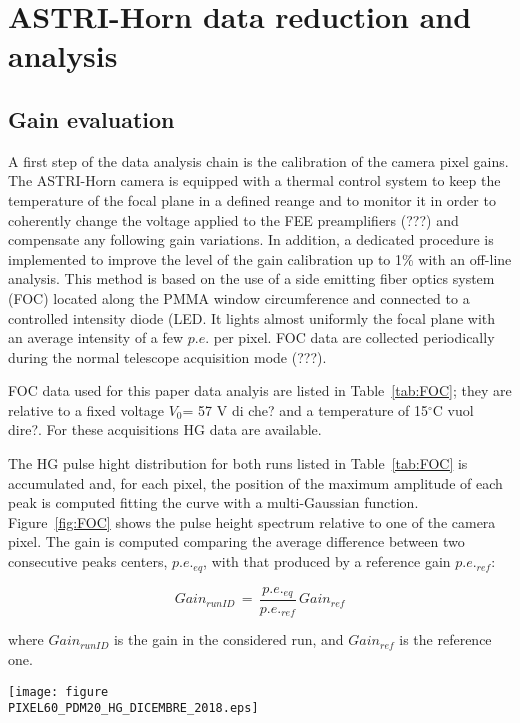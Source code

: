 \section{ASTRI-Horn data reduction and analysis} 
\label{sect:astridata}

\subsection{Gain evaluation}
\label{subs:gain}

A first step of the data analysis chain is the calibration of the camera pixel gains. 
The ASTRI-Horn camera is equipped with a thermal control system to keep the temperature of the focal plane in a defined reange and to monitor it in order to coherently change the voltage applied to the FEE preamplifiers (???) and compensate any following  gain variations. In addition, a dedicated procedure is implemented to improve the level of the gain calibration up to 1\% with an off-line analysis. This method is based on the use of a side emitting fiber optics system (FOC) located along the PMMA window circumference and connected to a controlled intensity diode (LED. It lights almost uniformly the focal plane with an average intensity of a few $p.e.$ per pixel. FOC data are collected periodically during the normal telescope acquisition mode (???).

FOC data used for this paper data analyis are listed in Table~\ref{tab:FOC}; they are relative to a fixed voltage $V_{0}$= 57 V {\tem di che?} and a temperature of 15$^\circ$C {\che vuol dire?}. For these acquisitions HG data are available.

The HG pulse hight distribution for both runs listed in Table~\ref{tab:FOC} is accumulated and, for each pixel, the position of the maximum amplitude of each peak is computed fitting the curve with a multi-Gaussian function. Figure~\ref{fig:FOC} shows the pulse height spectrum relative to one of the camera pixel. The gain is computed comparing the average difference between two consecutive peaks centers, $p.e._{eq}$, with that produced by a reference gain $p.e._{ref}$:

\begin{equation}
Gain_{run ID}\,=\,\frac{p.e._{eq}}{p.e._{ref}}\,Gain_{ref}
\end{equation}

\noindent
where $Gain_{run ID}$ is the gain in the considered run, and $Gain_{ref}$ is the reference one.

\begin{figure*}[ht!!]
\centering
\texttt{[image: figure\\PIXEL60\_PDM20\_HG\_DICEMBRE\_2018.eps]}
\vspace{0.5cm}
\caption{ Pulse height spectrum for one of the camera pixel during a FOC acquisition (black curve); data are relative to the HG electronics chain. The red curve shows the multiple peaks Gaussian fit.}
\label{fig:FOC}
\end{figure*}

